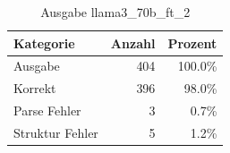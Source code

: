 
\begin{table}[!ht]
\centering
\begin{tabular}{lrr}
\toprule
\textbf{Kategorie} & \textbf{Anzahl} & \textbf{Prozent} \\
\midrule
Ausgabe & 404 & 100.0\% \\
Korrekt & 396 & 98.0\% \\
Parse Fehler & 3 & 0.7\% \\
Struktur Fehler & 5 & 1.2\% \\
\bottomrule
\end{tabular}
\caption{Ausgabe llama3_70b_ft_2}
\label{tab:file_counts}
\end{table}
    